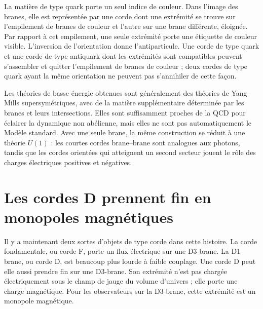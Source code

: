 
La matière de type quark porte un seul indice de couleur. Dans l’image des branes, elle est représentée par une corde dont une extrémité se trouve sur l’empilement de branes de couleur et l’autre sur une brane différente, éloignée. Par rapport à cet empilement, une seule extrémité porte une étiquette de couleur visible. L’inversion de l’orientation donne l’antiparticule. Une corde de type quark et une corde de type antiquark dont les extrémités sont compatibles peuvent s’assembler et quitter l’empilement de branes de couleur ; deux cordes de type quark ayant la même orientation ne peuvent pas s’annihiler de cette façon.

Les théories de basse énergie obtenues sont généralement des théories de Yang--Mills supersymétriques, avec de la matière supplémentaire déterminée par les branes et leurs intersections. Elles sont suffisamment proches de la QCD pour éclairer la dynamique non abélienne, mais elles ne sont pas automatiquement le Modèle standard. Avec une seule brane, la même construction se réduit à une théorie \(U(1)\) : les courtes cordes brane--brane sont analogues aux photons, tandis que les cordes orientées qui atteignent un second secteur jouent le rôle des charges électriques positives et négatives.

\section{Les cordes D prennent fin en monopoles magnétiques}

Il y a maintenant deux sortes d’objets de type corde dans cette histoire. La corde fondamentale, ou corde F, porte un flux électrique sur une D3-brane. La D1-brane, ou corde D, est beaucoup plus lourde à faible couplage. Une corde D peut elle aussi prendre fin sur une D3-brane. Son extrémité n’est pas chargée électriquement sous le champ de jauge du volume d’univers ; elle porte une charge magnétique. Pour les observateurs sur la D3-brane, cette extrémité est un monopole magnétique.

